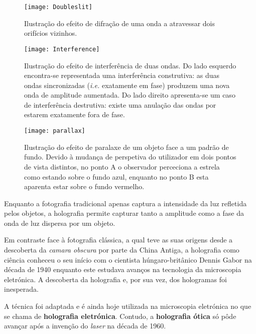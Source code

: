 \begin{figure}[!htbp]
  \centering
  \texttt{[image: Doubleslit]}
  \caption[Ilustração do efeito de difração.]{Ilustração do efeito de difração de uma onda a atravessar dois orifícios vizinhos\cite{img:doubleslit}.}
  \label{fig:diffraction}
\end{figure}

\begin{figure}[!htbp]
  \centering
  \texttt{[image: Interference]}
  \caption[Ilustração do efeito de interferência.]{Ilustração do efeito de interferência de duas ondas\cite{img:interference}. Do lado esquerdo encontra-se representada uma interferência construtiva: as duas ondas sincronizadas (\textit{i.e.} exatamente em fase) produzem uma nova onda de amplitude aumentada. Do lado direito apresenta-se um caso de interferência destrutiva: existe uma anulação das ondas por estarem exatamente fora de fase.}
  \label{fig:interference}
\end{figure}

\begin{figure}[!htbp]
  \centering
  \texttt{[image: parallax]}
  \caption[Ilustração do efeito de paralaxe.]{Ilustração do efeito de paralaxe de um objeto face a um padrão de fundo\cite{img:parallax}. Devido à mudança de perspetiva do utilizador em dois pontos de vista distintos, no ponto A o observador perceciona a estrela como estando sobre o fundo azul, enquanto no ponto B esta aparenta estar sobre o fundo vermelho.}
  \label{fig:parallax}
\end{figure}


Enquanto a fotografia tradicional apenas captura a intensidade da luz refletida pelos objetos, a holografia permite capturar tanto a amplitude como a fase da onda de luz dispersa por um objeto\cite{holocenter,Image2018,spencer1973the}.

Em contraste face à fotografia clássica, a qual teve as suas origens desde a descoberta da \textit{camara obscura} por parte da China Antiga\cite{Krebs2004}, a holografia como ciência conheceu o seu início com o cientista húngaro-britânico Dennis Gabor na década de 1940 enquanto este estudava avanços na tecnologia da microscopia eletrónica\cite{GABOR1948, GABOR1949}. A descoberta da holografia e, por sua vez, dos hologramas foi inesperada.

A técnica foi adaptada e é ainda hoje utilizada na microscopia eletrónica no que se chama de \textbf{holografia eletrónica}. Contudo, a \textbf{holografia ótica} só pôde avançar após a invenção do \textit{laser} na década de 1960\cite{Leith1962,Leith1964}.

